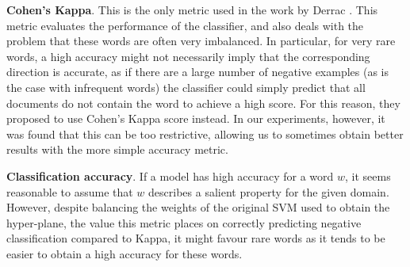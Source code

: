 \noindent

\noindent \textbf{Cohen's Kappa}. This is the only metric used in the work by Derrac \cite{Derrac2015}. This metric evaluates the performance of the classifier, and also deals with the problem that these words are often very imbalanced. In particular, for very rare words, a high accuracy might not necessarily imply that the corresponding direction is accurate, as if there are a large number of negative examples (as is the case with infrequent words) the classifier could simply predict that all documents do not contain the word to achieve a high score. For this reason, they proposed to use Cohen's Kappa score instead. In our experiments, however, it was found that this can be too restrictive, allowing us to sometimes obtain better results with the more simple accuracy metric.\smallskip %


 \textbf{Classification accuracy}. If a model has high accuracy for a word $w$, it seems reasonable to assume that $w$ describes a salient property for the given domain. However, despite balancing the weights of the original SVM used to obtain the hyper-plane, the value this metric places on correctly predicting negative classification  compared to Kappa, it might favour rare words as it tends to be easier to obtain a high accuracy for these words.%
\smallskip


